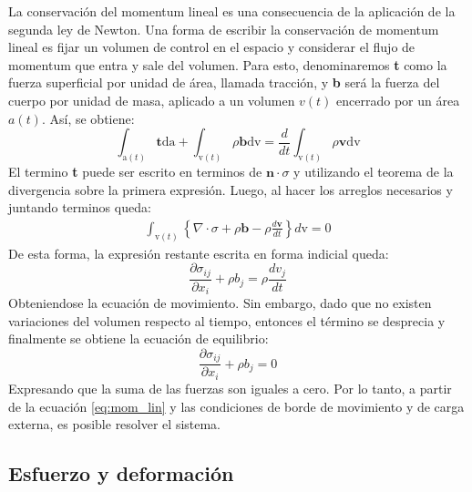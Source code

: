 La conservación del momentum lineal es una consecuencia de la aplicación de la segunda ley de Newton. Una forma de escribir la conservación de momentum lineal es fijar un volumen de control en el espacio y considerar el flujo de momentum que entra y sale del volumen. Para esto, denominaremos \textbf{t} como la fuerza superficial por unidad de área, llamada tracción, y \textbf{b} será la fuerza del cuerpo por unidad de masa, aplicado a un volumen $v(t)$ encerrado por un área $a(t)$. Así, se obtiene:
\begin{equation}
	\int_{\text{a}(t)} \mathbf{t} \text{da} + \int_{\text{v}(t)} \rho \mathbf{b} \text{dv} = \frac{d}{dt} \int_{\text{v}(t)} \rho \mathbf{v} \text{dv}
\end{equation}
El termino \textbf{t} puede ser escrito en terminos de $\mathbf{n}\cdot \sigma$ y utilizando el teorema de la divergencia sobre la primera expresión. Luego, al hacer los arreglos necesarios y juntando terminos queda:
\begin{gather*}
	\int_{\text{v}(t)} \left\lbrace \nabla \cdot \sigma + \rho\mathbf{b} - \rho \frac{d\mathbf{v}}{dt}\right\rbrace d\text{v} = 0
\end{gather*}
De esta forma, la expresión restante escrita en forma indicial queda:
\begin{equation}
	\frac{\partial \sigma_{ij}}{\partial x_i} + \rho b_j = \rho \frac{dv_j}{dt}
\end{equation}
Obteniendose la ecuación de movimiento. Sin embargo, dado que no existen variaciones del volumen respecto al tiempo, entonces el término se desprecia y finalmente se obtiene la ecuación de equilibrio:
\begin{equation}\label{eq:mom_lin}
	\frac{\partial \sigma_{ij}}{\partial x_i} + \rho b_j = 0
\end{equation}
Expresando que la suma de las fuerzas son iguales a cero. Por lo tanto, a partir de la ecuación \ref{eq:mom_lin} y las condiciones de borde de movimiento y de carga externa, es posible resolver el sistema.

\subsection{Esfuerzo y deformación}

